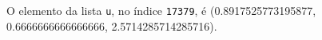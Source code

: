 \documentclass[12pt,varwidth=16cm,border=1pt]{standalone}
\begin{document}
O elemento da lista \verb+u+, no índice \verb+17379+, é (0.8917525773195877, 0.6666666666666666, 2.5714285714285716).

\questiomfalse
\end{document}
